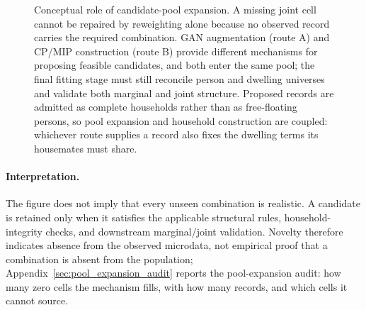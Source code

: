 \begin{figure}[htbp]
%
\caption{Conceptual role of candidate-pool expansion. A missing joint cell
cannot be repaired by reweighting alone because no observed record carries
the required combination. GAN augmentation (route A) and CP/MIP construction
(route B) provide different mechanisms for proposing feasible candidates, and
both enter the same pool; the final fitting stage must still reconcile person
and dwelling universes and validate both marginal and joint structure.
Proposed records are admitted as complete households rather than as
free-floating persons, so pool expansion and household construction are
coupled: whichever route supplies a record also fixes the dwelling terms its
housemates must share.}
\label{fig:missing-cells-framework}
\end{figure}

\paragraph{Interpretation.}
The figure does not imply that every unseen combination is realistic. A
candidate is retained only when it satisfies the applicable structural rules,
household-integrity checks, and downstream marginal/joint validation. Novelty
therefore indicates absence from the observed microdata, not empirical proof
that a combination is absent from the population; Appendix~\ref{sec:pool_expansion_audit} reports the pool-expansion audit: how many zero cells the mechanism fills, with how many records, and which cells it cannot source.

